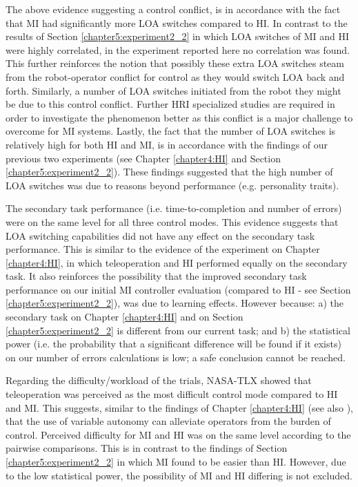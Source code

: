 \documentclass[a4paper,12pt,oneside,openright]{bhamthesis}
\begin{document}
The above evidence suggesting a control conflict, is in accordance with the fact that MI had significantly more LOA switches compared to HI. In contrast to the results of Section \ref{chapter5:experiment2_2} in which LOA switches of MI and HI were highly correlated, in the experiment reported here no correlation was found. This further reinforces the notion that possibly these extra LOA switches steam from the robot-operator conflict for control as they would switch LOA back and forth. Similarly, a number of LOA switches initiated from the robot they might be due to this control conflict. Further HRI specialized studies are required in order to investigate the phenomenon better as this conflict is a major challenge to overcome for MI systems. Lastly, the fact that the number of LOA switches is relatively high for both HI and MI, is in accordance with the findings of our previous two experiments (see Chapter \ref{chapter4:HI} and Section \ref{chapter5:experiment2_2}). These findings suggested that the high number of LOA switches was due to reasons beyond performance (e.g. personality traits).

The secondary task performance (i.e. time-to-completion and number of errors) were on the same level for all three control modes. This evidence suggests that LOA switching capabilities did not have any effect on the secondary task performance. This is similar to the evidence of the experiment on Chapter \ref{chapter4:HI}, in which teleoperation and HI performed equally on the secondary task. It also reinforces the possibility that the improved secondary task performance on our initial MI controller evaluation (compared to HI - see Section \ref{chapter5:experiment2_2}), was due to learning effects. However because: a) the secondary task on Chapter \ref{chapter4:HI} and on Section \ref{chapter5:experiment2_2} is different from our current task; and b) the statistical power (i.e. the probability that a significant difference will be found if it exists) on our number of errors calculations is low; a safe conclusion cannot be reached.

Regarding the difficulty/workload of the trials, NASA-TLX showed that teleoperation was perceived as the most difficult control mode compared to HI and MI. This suggests, similar to the findings of Chapter \ref{chapter4:HI} (see also \cite{Chiou2016}), that the use of variable autonomy can alleviate operators from the burden of control. Perceived difficulty for MI and HI was on the same level according to the pairwise comparisons. This is in contrast to the findings of Section \ref{chapter5:experiment2_2} in which MI found to be easier than HI. However, due to the low statistical power, the possibility of MI and HI differing is not excluded.
\end{document}
